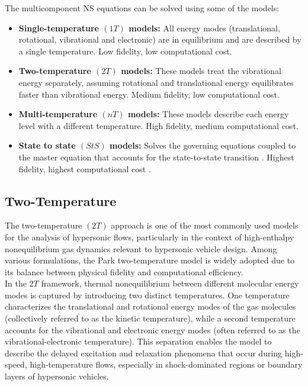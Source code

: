 The multicomponent \gls{NS} equations can be solved using some of the models:
\begin{itemize}
    \item \textbf{Single-temperature $(1T)$ models:} All energy modes
        (translational, rotational, vibrational and electronic) are in
    equilibrium and are described by a single temperature. Low fidelity, low
        computational cost.
    \item \textbf{Two-temperature $(2T)$ models:} These models treat the
        vibrational energy separately, assuming rotational and translational
        energy equilibrates faster than vibrational energy. Medium fidelity,
        low computational cost.
    \item \textbf{Multi-temperature $(nT)$ models:} These models describe each
        energy level with a different temperature. High fidelity, medium computational cost.
    \item \textbf{State to state $(StS)$ models:} Solves the governing
        equations coupled to the master equation that accounts for the
        state-to-state transition \cite{Josyula2017}. Highest fidelity, highest
        computational cost \cite{Hanquist2020}.
\end{itemize}

\subsection{Two-Temperature}
The two-temperature $(2T)$ approach is one of the most commonly used models for
the analysis of hypersonic flows, particularly in the context of high-enthalpy
nonequilibrium gas dynamics relevant to hypersonic vehicle design. Among
various formulations, the Park two-temperature model \cite{Park1989} is widely
adopted due to its balance between physical fidelity and computational
efficiency. \\

In the $2T$ framework, thermal nonequilibrium between different molecular
energy modes is captured by introducing two distinct temperatures. One
temperature characterizes the translational and rotational energy modes of the
gas molecules (collectively referred to as the kinetic temperature), while a
second temperature accounts for the vibrational and electronic energy modes
(often referred to as the vibrational-electronic temperature). This separation
enables the model to describe the delayed excitation and relaxation phenomena
that occur during high-speed, high-temperature flows, especially in
shock-dominated regions or boundary layers of hypersonic vehicles. \\

